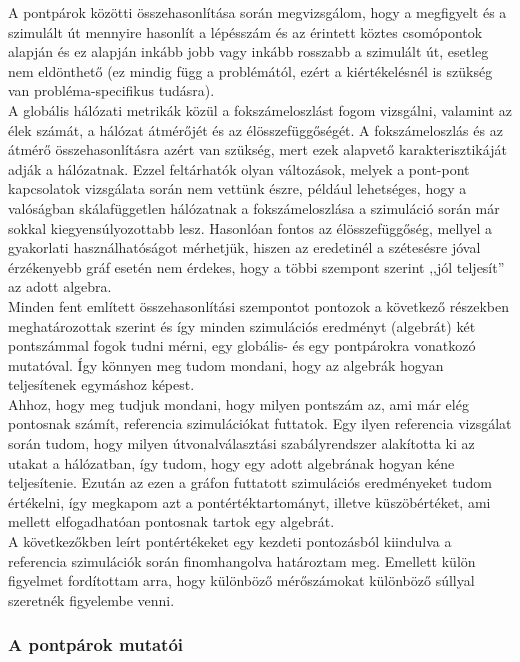     A pontpárok közötti összehasonlítása során megvizsgálom, hogy a megfigyelt és a szimulált út mennyire hasonlít a lépésszám és az érintett köztes csomópontok alapján és ez alapján inkább jobb vagy inkább rosszabb a szimulált út, esetleg nem eldönthető (ez mindig függ a problémától, ezért a kiértékelésnél is szükség van probléma-specifikus tudásra).\\
    A globális hálózati metrikák közül a fokszámeloszlást fogom vizsgálni, valamint az élek számát, a hálózat átmérőjét és az élösszefüggőségét. A fokszámeloszlás és az átmérő összehasonlításra azért van szükség, mert ezek alapvető karakterisztikáját adják a hálózatnak. Ezzel feltárhatók olyan változások, melyek a pont-pont kapcsolatok vizsgálata során nem vettünk észre, például lehetséges, hogy a valóságban skálafüggetlen hálózatnak a fokszámeloszlása a szimuláció során már sokkal kiegyensúlyozottabb lesz. Hasonlóan fontos az élösszefüggőség, mellyel a gyakorlati használhatóságot mérhetjük, hiszen az eredetinél a szétesésre jóval érzékenyebb gráf esetén nem érdekes, hogy a többi szempont szerint ,,jól teljesít'' az adott algebra.\\

    Minden fent említett összehasonlítási szempontot pontozok a következő részekben meghatározottak szerint és így minden szimulációs eredményt (algebrát) két pontszámmal fogok tudni mérni, egy globális- és egy pontpárokra vonatkozó mutatóval. Így könnyen meg tudom mondani, hogy az algebrák hogyan teljesítenek egymáshoz képest.\\

    Ahhoz, hogy meg tudjuk mondani, hogy milyen pontszám az, ami már elég pontosnak számít, referencia szimulációkat futtatok. Egy ilyen referencia vizsgálat során tudom, hogy milyen útvonalválasztási szabályrendszer alakította ki az utakat a hálózatban, így tudom, hogy egy adott algebrának hogyan kéne teljesítenie. Ezután az ezen a gráfon futtatott szimulációs eredményeket tudom értékelni, így megkapom azt a pontértéktartományt, illetve küszöbértéket, ami mellett elfogadhatóan pontosnak tartok egy algebrát.\\
    A következőkben leírt pontértékeket egy kezdeti pontozásból kiindulva a referencia szimulációk során finomhangolva határoztam meg. Emellett külön figyelmet fordítottam arra, hogy különböző mérőszámokat különböző súllyal szeretnék figyelembe venni.

    \subsubsection{A pontpárok mutatói}
